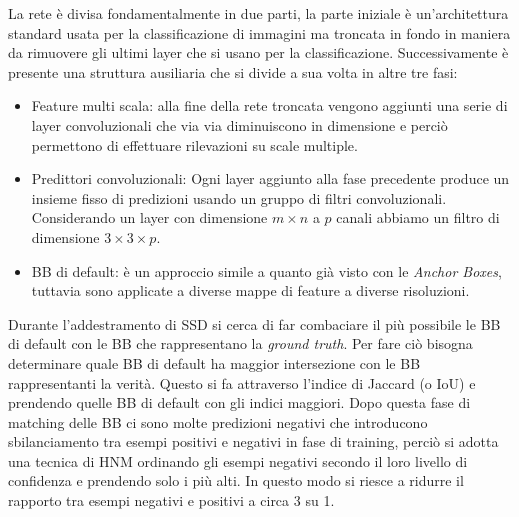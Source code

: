 La rete è divisa fondamentalmente in due parti, la parte iniziale è un'architettura standard usata per la classificazione di immagini ma troncata in fondo in maniera da rimuovere gli ultimi layer che si usano per la classificazione. Successivamente è presente una struttura ausiliaria che si divide a sua volta in altre tre fasi:
\begin{itemize}
    \item Feature multi scala: alla fine della rete troncata vengono aggiunti una serie di layer convoluzionali che via via diminuiscono in dimensione e perciò permettono di effettuare rilevazioni su scale multiple. 
    \item Predittori convoluzionali: Ogni layer aggiunto alla fase precedente produce un insieme fisso di predizioni usando un gruppo di filtri convoluzionali. Considerando un layer con dimensione $m \times n$ a $p$ canali abbiamo un filtro di dimensione $3 \times 3 \times p$.
    \item \ac{BB} di default: è un approccio simile a quanto già visto con le \textit{Anchor Boxes}, tuttavia sono applicate a diverse mappe di feature a diverse risoluzioni. 
\end{itemize}
Durante l'addestramento di \ac{SSD} si cerca di far combaciare il più possibile le \ac{BB} di default con le \ac{BB} che rappresentano la \textit{ground truth}. Per fare ciò bisogna determinare quale \ac{BB} di default ha maggior intersezione con le \ac{BB} rappresentanti la verità. Questo si fa attraverso l'indice di Jaccard (o \ac{IoU}) e prendendo quelle \ac{BB} di default con gli indici maggiori. 
Dopo questa fase di matching delle \ac{BB} ci sono molte predizioni negativi che introducono sbilanciamento tra esempi positivi e negativi in fase di training, perciò si adotta una tecnica di \ac{HNM} ordinando gli esempi negativi secondo il loro livello di confidenza e prendendo solo i più alti. In questo modo si riesce a ridurre il rapporto tra esempi negativi e positivi a circa 3 su 1.
